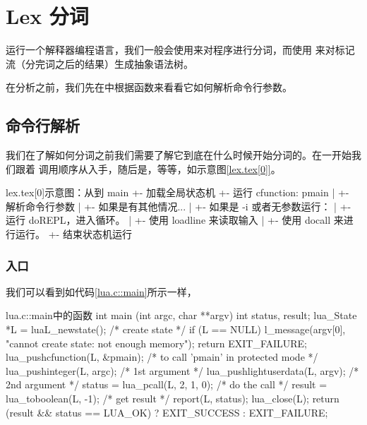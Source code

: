

\chapter{Lex 分词}

运行一个解释器编程语言，我们一般会使用来对程序进行分词，而使用%
来对标记流（分完词之后的结果）生成抽象语法树。

在分析之前，我们先在中根据函数来看看它如何解析命令行参数。

\section{命令行解析}

我们在了解如何分词之前我们需要了解它到底在什么时候开始分词的。在一开始我们跟着
调用顺序从入手，随后是，等等，如示意图\ref{lex.tex[0]}。

\begin{code}{lex.tex[0]}{示意图：从到}
main
 +- 加载全局状态机
 +- 运行 cfunction: pmain
 |   +- 解析命令行参数
 |   +- 如果是有其他情况...
 |   +- 如果是 -i 或者无参数运行：
 |       +- 运行 doREPL，进入循环。
 |           +- 使用 loadline 来读取输入
 |           +- 使用 docall 来进行运行。
 +- 结束状态机运行
\end{code}

\subsection{入口}

我们可以看到如代码\ref{lua.c::main}所示一样，

\begin{ccode}{lua.c::main}{中的函数}
int main (int argc, char **argv) {
  int status, result;
  lua_State *L = luaL_newstate();  /* create state */
  if (L == NULL) {
    l_message(argv[0], "cannot create state: not enough memory");
    return EXIT_FAILURE;
  }
  lua_pushcfunction(L, &pmain);  /* to call 'pmain' in protected mode */
  lua_pushinteger(L, argc);  /* 1st argument */
  lua_pushlightuserdata(L, argv); /* 2nd argument */
  status = lua_pcall(L, 2, 1, 0);  /* do the call */
  result = lua_toboolean(L, -1);  /* get result */
  report(L, status);
  lua_close(L);
  return (result && status == LUA_OK) ? EXIT_SUCCESS : EXIT_FAILURE;
}
\end{ccode}

